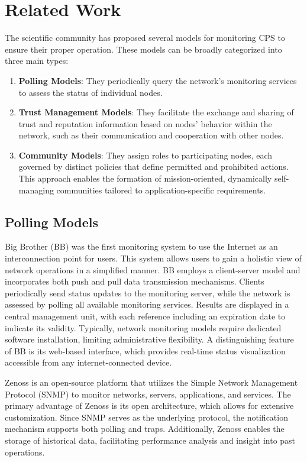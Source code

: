 \section{Related Work}
\label{Related-Work}
The scientific community has proposed several models for monitoring CPS to ensure their proper operation. These models can be broadly categorized into three main types:

\begin{enumerate}
 \item \textbf{Polling Models}: They periodically query the network's monitoring services to assess the status of individual nodes.
 \item \textbf{Trust Management Models}: They facilitate the exchange and sharing of trust and reputation information based on nodes' behavior within the network, such as their communication and cooperation with other nodes.
 \item \textbf{Community Models}: They assign roles to participating nodes, each governed by distinct policies that define permitted and prohibited actions. This approach enables the formation of mission-oriented, dynamically self-managing communities tailored to application-specific requirements.
\end{enumerate}

\subsection{Polling Models}
Big Brother (BB) \cite{MacGuire1997} was the first monitoring system to use the Internet as an interconnection point for users. This system allows users to gain a holistic view of network operations in a simplified manner. BB employs a client-server model and incorporates both push and pull data transmission mechanisms. Clients periodically send status updates to the monitoring server, while the network is assessed by polling all available monitoring services. Results are displayed in a central management unit, with each reference including an expiration date to indicate its validity. Typically, network monitoring models require dedicated software installation, limiting administrative flexibility. A distinguishing feature of BB is its web-based interface, which provides real-time status visualization accessible from any internet-connected device.

Zenoss \cite{Badger2008} is an open-source platform that utilizes the Simple Network Management Protocol (SNMP) \cite{Fedor1990,Stallings1993} to monitor networks, servers, applications, and services. The primary advantage of Zenoss is its open architecture, which allows for extensive customization. Since SNMP serves as the underlying protocol, the notification mechanism supports both polling and traps. Additionally, Zenoss enables the storage of historical data, facilitating performance analysis and insight into past operations.

